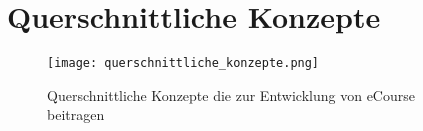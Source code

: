\chapter{Querschnittliche Konzepte}
\label{sec:quer}

\begin{landscape}
\begin{figure}[H]
\centering
\texttt{[image: querschnittliche\_konzepte.png]}
\caption{Querschnittliche Konzepte die zur Entwicklung von eCourse beitragen}
\label{fib:querschnitt}
\end{figure}
\end{landscape}